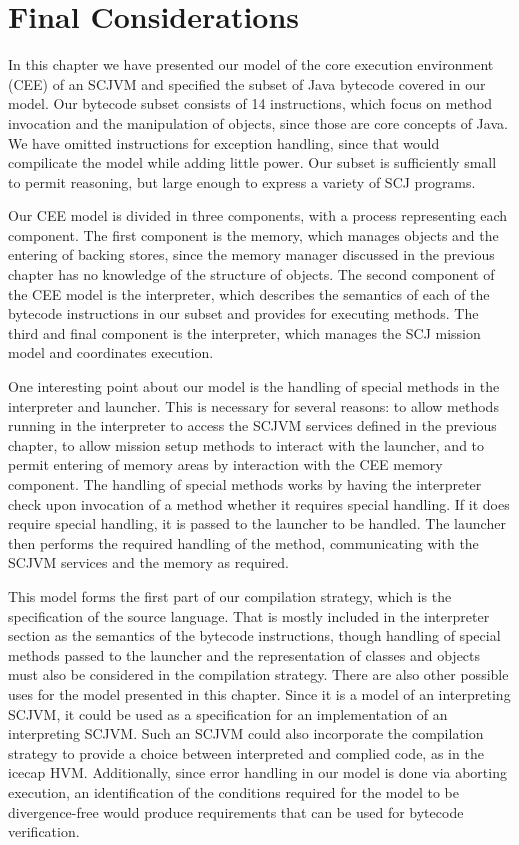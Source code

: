 \section{Final Considerations}
\label{cee-final-considerations-section}

In this chapter we have presented our model of the core execution
environment (CEE) of an SCJVM and specified the subset of Java
bytecode covered in our model.
Our bytecode subset consists of 14 instructions, which focus on method
invocation and the manipulation of objects, since those are core
concepts of Java.
We have omitted instructions for exception handling, since that would
compilicate the model while adding little power.
Our subset is sufficiently small to permit reasoning, but large enough
to express a variety of SCJ programs.

Our CEE model is divided in three components, with a \Circus{} process
representing each component.
The first component is the memory, which manages objects and the
entering of backing stores, since the memory manager discussed in the
previous chapter has no knowledge of the structure of objects.
The second component of the CEE model is the interpreter, which
describes the semantics of each of the bytecode instructions in our
subset and provides for executing methods.
The third and final component is the interpreter, which manages the
SCJ mission model and coordinates execution.

One interesting point about our model is the handling of special
methods in the interpreter and launcher.
This is necessary for several reasons: to allow methods running in the
interpreter to access the SCJVM services defined in the previous
chapter, to allow mission setup methods to interact with the launcher,
and to permit entering of memory areas by interaction with the CEE
memory component.
The handling of special methods works by having the interpreter check
upon invocation of a method whether it requires special handling.
If it does require special handling, it is passed to the launcher to
be handled.
The launcher then performs the required handling of the method,
communicating with the SCJVM services and the memory as required.

This model forms the first part of our compilation strategy, which is
the specification of the source language.
That is mostly included in the interpreter section as the semantics of
the bytecode instructions, though handling of special methods passed
to the launcher and the representation of classes and objects must
also be considered in the compilation strategy.
There are also other possible uses for the model presented in this
chapter.
Since it is a model of an interpreting SCJVM, it could be used as a
specification for an implementation of an interpreting SCJVM.
Such an SCJVM could also incorporate the compilation strategy to
provide a choice between interpreted and complied code, as in the
icecap HVM.
Additionally, since error handling in our model is done via aborting
execution, an identification of the conditions required for the model
to be divergence-free would produce requirements that can be used for
bytecode verification.
